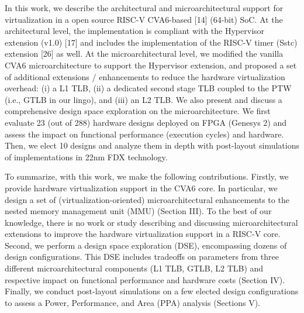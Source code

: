 In this work, we describe the architectural and microarchitectural support for virtualization in a open source RISC-V
CVA6-based [14] (64-bit) SoC. At the architectural level, the
implementation is compliant with the Hypervisor extension
(v1.0) [17] and includes the implementation of the RISC-V
timer (Sstc) extension [26] as well. At the microarchitectural
level, we modified the vanilla CVA6 microarchitecture to
support the Hypervisor extension, and proposed a set of
additional extensions / enhancements to reduce the hardware
virtualization overhead: (i) a L1 TLB, (ii) a dedicated second
stage TLB coupled to the PTW (i.e., GTLB in our lingo), and
(iii) an L2 TLB. We also present and discuss a comprehensive
design space exploration on the microarchitecture. We first
evaluate 23 (out of 288) hardware designs deployed on FPGA
(Genesys 2) and assess the impact on functional performance
(execution cycles) and hardware. Then, we elect 10 designs
and analyze them in depth with post-layout simulations of
implementations in 22nm FDX technology.

To summarize, with this work, we make the following
contributions. Firstly, we provide hardware virtualization support in the CVA6 core. In particular, we design a set of
(virtualization-oriented) microarchitectural enhancements to
the nested memory management unit (MMU) (Section III). To
the best of our knowledge, there is no work or study describing
and discussing microarchitectural extensions to improve the
hardware virtualization support in a RISC-V core. Second,
we perform a design space exploration (DSE), encompassing
dozens of design configurations. This DSE includes tradeoffs on parameters from three different microarchitectural
components (L1 TLB, GTLB, L2 TLB) and respective impact
on functional performance and hardware costs (Section IV).
Finally, we conduct post-layout simulations on a few elected
design configurations to assess a Power, Performance, and
Area (PPA) analysis (Sections V).

